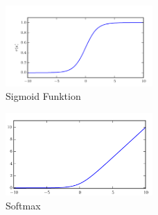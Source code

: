 \documentclass{llncs}
\begin{document}
	\begin{figure}[htbp] 
		\centering
		\includegraphics[width=0.5\textwidth]{sigmoid.png}
		\caption{Sigmoid Funktion}
		\label{fig:Bild3}
	\end{figure}
	
	\begin{figure}[htbp] 
		\centering
		\includegraphics[width=0.5\textwidth]{softmax.png}
		\caption{Softmax}
		\label{fig:Bild4}
	\end{figure}
	\newpage
\end{document}
